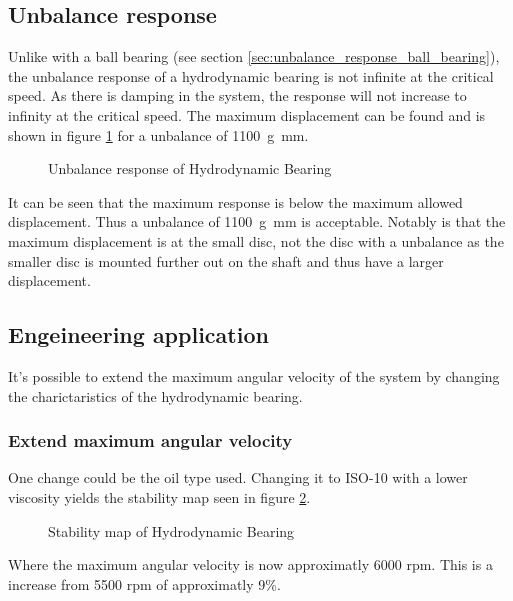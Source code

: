 \subsection{Unbalance response}
Unlike with a ball bearing (see section \ref{sec:unbalance_response_ball_bearing}), the unbalance response of a hydrodynamic bearing is not infinite at the critical speed. As there is damping in the system, the response will not increase to infinity at the critical speed. The maximum displacement can be found and is shown in figure \ref{fig:hydrodynamic_bearing_unbalance_response} for a unbalance of \SI{1100}{\gram \milli \meter}.
\begin{figure}[htbp]
    \centering
    
    \caption{Unbalance response of Hydrodynamic Bearing}
    \label{fig:hydrodynamic_bearing_unbalance_response}
\end{figure}
It can be seen that the maximum response is below the maximum allowed displacement. Thus a unbalance of \SI{1100}{\gram \milli \meter} is acceptable. Notably is that the maximum displacement is at the small disc, not the disc with a unbalance as the smaller disc is mounted further out on the shaft and thus have a larger displacement.

\subsection{Engeineering application}
It's possible to extend the maximum angular velocity of the system by changing the charictaristics of the hydrodynamic bearing.

\subsubsection{Extend maximum angular velocity}
One change could be the oil type used. Changing it to ISO-10 with a lower viscosity yields the stability map seen in figure \ref{fig:hydrodynamic_bearing_stability_map}.
\begin{figure}[htbp]
    \centering
    
    \caption{Stability map of Hydrodynamic Bearing}
    \label{fig:hydrodynamic_bearing_stability_map}
\end{figure}
Where the maximum angular velocity is now approximatly 6000 rpm. This is a increase from 5500 rpm of approximatly 9\%.